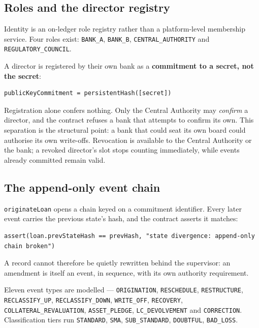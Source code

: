 \documentclass[11pt,a4paper]{article}
\begin{document}
\subsection{Roles and the director registry}

Identity is an on-ledger role registry rather than a platform-level membership service. Four roles exist:
\texttt{BANK\_A}, \texttt{BANK\_B}, \texttt{CENTRAL\_AUTHORITY} and \texttt{REGULATORY\_COUNCIL}.

A director is registered by their own bank as a \textbf{commitment to a secret, not the secret}:

\begin{Verbatim}
publicKeyCommitment = persistentHash([secret])
\end{Verbatim}

Registration alone confers nothing. Only the Central Authority may \emph{confirm} a director, and the
contract refuses a bank that attempts to confirm its own. This separation is the structural point: a bank
that could seat its own board could authorise its own write-offs. Revocation is available to the Central
Authority or the bank; a revoked director's slot stops counting immediately, while events already
committed remain valid.

\subsection{The append-only event chain}

\texttt{originateLoan} opens a chain keyed on a commitment identifier. Every later event carries the
previous state's hash, and the contract asserts it matches:

\begin{Verbatim}
assert(loan.prevStateHash == prevHash, "state divergence: append-only chain broken")
\end{Verbatim}

A record cannot therefore be quietly rewritten behind the supervisor: an amendment is itself an event, in
sequence, with its own authority requirement.

Eleven event types are modelled --- \texttt{ORIGINATION}, \texttt{RESCHEDULE}, \texttt{RESTRUCTURE},
\texttt{RECLASSIFY\_UP}, \texttt{RECLASSIFY\_DOWN}, \texttt{WRITE\_OFF}, \texttt{RECOVERY},
\texttt{COLLATERAL\_REVALUATION}, \texttt{ASSET\_PLEDGE}, \texttt{LC\_DEVOLVEMENT} and
\texttt{CORRECTION}. Classification tiers run \texttt{STANDARD}, \texttt{SMA}, \texttt{SUB\_STANDARD},
\texttt{DOUBTFUL}, \texttt{BAD\_LOSS}.
\end{document}
